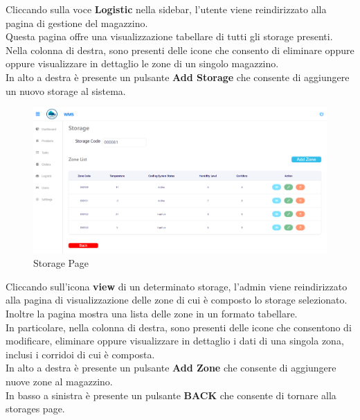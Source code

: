 Cliccando sulla voce \textbf{Logistic} nella sidebar, l'utente viene reindirizzato alla pagina di gestione del magazzino.\\
Questa pagina offre una visualizzazione tabellare di tutti gli storage presenti.\\
Nella colonna di destra, sono presenti delle icone che consento di eliminare oppure oppure visualizzare in dettaglio
le zone di un singolo magazzino.\\
In alto a destra è presente un pulsante \textbf{Add Storage} che consente di aggiungere un nuovo storage al sistema.

\begin{figure}[H]
    \centering
    \includegraphics[width=\textwidth]{document/sections/img/Storyboard/viewStorage.png}
    \caption{Storage Page}
    \label{fig:storagePage}
\end{figure}

Cliccando sull'icona \textbf{view} di un determinato storage, l’admin viene
reindirizzato alla pagina di visualizzazione delle zone di cui è composto lo storage selezionato.\\
Inoltre la pagina mostra una lista delle zone in un formato tabellare. \\
In particolare, nella colonna di destra, sono presenti delle icone che consentono di modificare, eliminare oppure
visualizzare in dettaglio i dati di una singola zona, inclusi i corridoi di cui è composta.\\
In alto a destra è presente un pulsante \textbf{Add Zone} che consente di aggiungere nuove zone al magazzino.\\
In basso a sinistra è presente un pulsante \textbf{BACK} che consente di tornare alla storages page.

